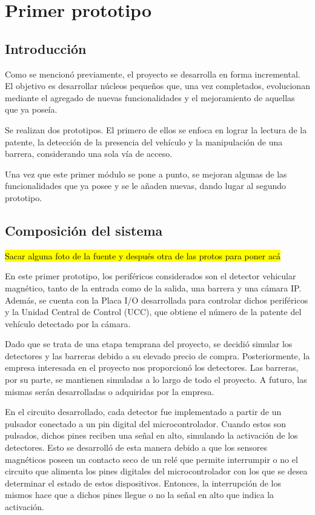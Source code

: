 \chapter{Primer prototipo}  \label{cap:prototipo1}
\section{Introducción}\label{sec:introProto1}

Como se mencionó previamente, el proyecto se desarrolla en forma incremental. El objetivo es desarrollar núcleos pequeños que, una vez completados, evolucionan mediante el agregado de nuevas funcionalidades y el mejoramiento de aquellas que ya poseía.

Se realizan dos prototipos. El primero de ellos se enfoca en lograr la lectura de la patente, la detección de la presencia del vehículo y la manipulación de una barrera, considerando una sola vía de acceso.

Una vez que este primer módulo se pone a punto, se mejoran algunas de las funcionalidades que ya posee y se le añaden nuevas, dando lugar al segundo prototipo. 


\section{Composición del sistema}\label{sec:compSist}

\hl{Sacar alguna foto de la fuente y despu\'es otra de las protos para poner ac\'a}

En este primer prototipo, los periféricos considerados son el detector vehicular magnético, tanto de la entrada como de la salida, una barrera y una cámara IP. Además, se cuenta con la Placa I/O desarrollada para controlar dichos periféricos y la Unidad Central de Control (UCC), que obtiene el número de la patente del vehículo detectado por la cámara.

Dado que se trata de una etapa temprana del proyecto, se decidió simular los detectores y las barreras debido a su elevado precio de compra. Posteriormente, la empresa interesada en el proyecto nos proporcionó los detectores. Las barreras, por su parte, se mantienen simuladas a lo largo de todo el proyecto. A futuro, las mismas serán desarrolladas o adquiridas por la empresa.

En el circuito desarrollado, cada detector fue implementado a partir de un pulsador conectado a un pin digital del microcontrolador. Cuando estos son pulsados, dichos pines reciben una señal en alto, simulando la activación de los detectores. Esto se desarrolló de esta manera debido a que los sensores magnéticos poseen un contacto seco de un relé que permite interrumpir o no el circuito que alimenta los pines digitales del microcontrolador con los que se desea determinar el estado de estos dispositivos. Entonces, la interrupción de los mismos hace que a dichos pines llegue o no la señal en alto que indica la activación.

